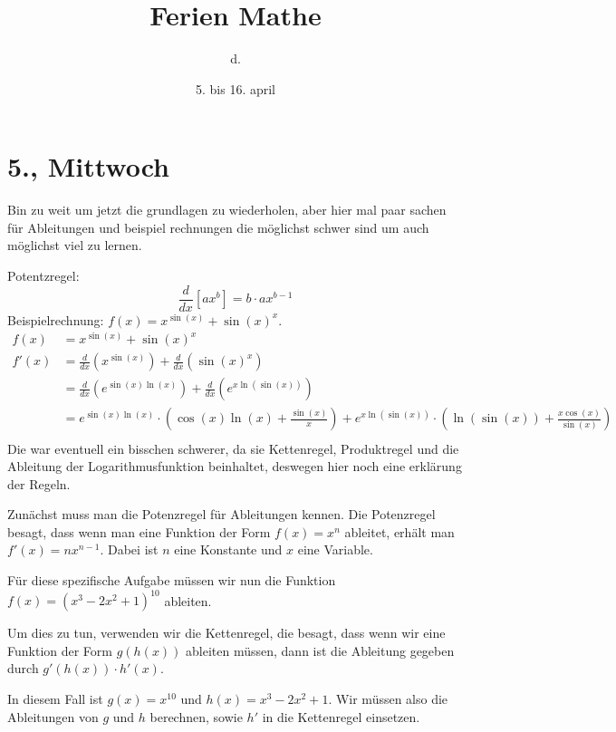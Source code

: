 \documentclass{article}
\title{Ferien Mathe}
\author{d.}
\date{5. bis 16. april}
\begin{document}
\maketitle
\tableofcontents
\clearpage

\section{5., Mittwoch}

Bin zu weit um jetzt die grundlagen zu wiederholen, aber hier mal paar sachen
f\"ur Ableitungen und beispiel rechnungen die m\"oglichst schwer sind um auch
m\"oglichst viel zu lernen.

Potentzregel:
\begin{equation*}
    \frac{d}{dx}\left[ax^b\right]=b\cdot ax^{b-1}
\end{equation*}
Beispielrechnung: $f(x) = x^{\sin(x)} + \sin(x)^x$.
\begin{align*}
f(x) &= x^{\sin(x)} + \sin(x)^x \\
f'(x) &= \frac{d}{dx} \left(x^{\sin(x)}\right) + \frac{d}{dx} \left(\sin(x)^x\right) \\
&= \frac{d}{dx} \left(e^{\sin(x) \ln(x)}\right) + \frac{d}{dx} \left(e^{x \ln(\sin(x))}\right) \\
&= e^{\sin(x) \ln(x)} \cdot \left(\cos(x) \ln(x) + \frac{\sin(x)}{x}\right) +
e^{x \ln(\sin(x))} \cdot \left(\ln(\sin(x)) + \frac{x \cos(x)}{\sin(x)}\right)\\
\end{align*}
Die war eventuell ein bisschen schwerer, da sie Kettenregel, Produktregel und
die Ableitung der Logarithmusfunktion beinhaltet, deswegen hier noch eine
erkl\"arung der Regeln.

Zunächst muss man die Potenzregel für Ableitungen kennen. Die Potenzregel besagt, dass wenn man eine Funktion der Form $f(x) = x^n$ ableitet, erhält man $f'(x) = nx^{n-1}$. Dabei ist $n$ eine Konstante und $x$ eine Variable.

Für diese spezifische Aufgabe müssen wir nun die Funktion $f(x) = (x^3 - 2x^2 + 1)^{10}$ ableiten.

Um dies zu tun, verwenden wir die Kettenregel, die besagt, dass wenn wir eine Funktion der Form $g(h(x))$ ableiten müssen, dann ist die Ableitung gegeben durch $g'(h(x)) \cdot h'(x)$.

In diesem Fall ist $g(x) = x^{10}$ und $h(x) = x^3 - 2x^2 + 1$. Wir müssen also die Ableitungen von $g$ und $h$ berechnen, sowie $h'$ in die Kettenregel einsetzen.
\end{document}
